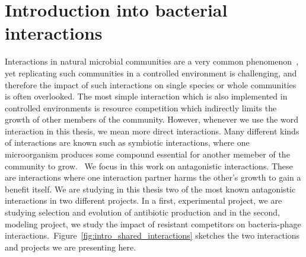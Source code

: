 \chapter{Introduction into bacterial interactions}
Interactions in natural microbial communities are a very common phenomenon~\cite{Weiland-Brauer2021-eq, Braga2016-fr}, yet replicating such communities in a controlled environment is challenging, and therefore the impact of such interactions on single species or whole communities is often overlooked. The most simple interaction which is also implemented in controlled environments is resource competition which indirectly limits the growth of other members of the community. However, whenever we use the word interaction in this thesis, we mean more direct interactions. Many different kinds of interactions are known such as symbiotic interactions, where one microorganism produces some compound essential for another memeber of the community to grow.~\cite{Sarsan2021-pn} We focus in this work on antagonistic interactions. These are interactions where one interaction partner harms the other's growth to gain a benefit itself. We are studying in this thesis two of the most known antagonistic interactions in two different projects. In a first, experimental project, we are studying selection and evolution of antibiotic production and in the second, modeling project, we study the impact of resistant competitors on bacteria-phage interactions.~Figure~\ref{fig:intro_shared_interactions} sketches the two interactions and projects we are presenting here.

